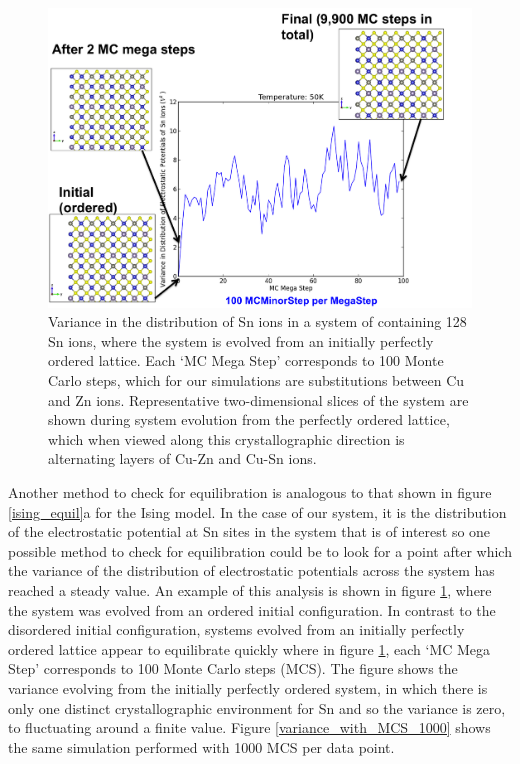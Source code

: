 \begin{figure}[h!]
  \centering
    \includegraphics[width=1.0\textwidth]{figures/50K_100Minor-per-mega+visuals.png}
    \caption{Variance in the distribution of Sn ions in a system of containing 128 Sn ions, where the system is evolved from an initially perfectly ordered lattice. Each `MC Mega Step' corresponds to 100 Monte Carlo steps, which for our simulations are substitutions between Cu and Zn ions. Representative two-dimensional slices of the system are shown during system evolution from the perfectly ordered lattice, which when viewed along this crystallographic direction is alternating layers of Cu-Zn and Cu-Sn ions.}
  \label{variance_with_MCS}
\end{figure}

Another method to check for equilibration is analogous to that shown in figure \ref{ising_equil}a for the Ising model. In the case of our system, it is the distribution of the electrostatic potential at Sn sites in the system that is of interest so one possible method to check for equilibration could be to look for a point after which the variance of the distribution of electrostatic potentials across the system has reached a steady value. An example of this analysis is shown in figure \ref{variance_with_MCS}, where the system was evolved from an ordered initial configuration. In contrast to the disordered initial configuration, systems evolved from an initially perfectly ordered lattice appear to equilibrate quickly where in figure \ref{variance_with_MCS}, each `MC Mega Step' corresponds to 100 Monte Carlo steps (MCS). The figure shows the variance evolving from the initially perfectly ordered system, in which there is only one distinct crystallographic environment for Sn and so the variance is zero, to fluctuating around a finite value. Figure \ref{variance_with_MCS_1000} shows the same simulation performed with 1000 MCS per data point.

